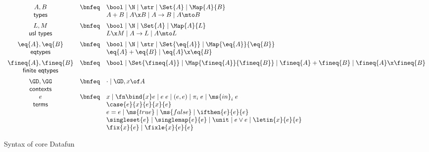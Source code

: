 \documentclass[preprint]{sigplanconf}
\renewcommand{\pipe}{\mathrel{\mid}} %
\newcommand{\uto}{\to}
\begin{document}



\begin{figure}
  \[\begin{array}{ccl}
    A, B     &\bnfeq& \bool \pipe \N \pipe \str \pipe \Set{A}
                      \pipe \Map{A}{B}
    \\
    \textsf{types} && A + B \pipe A \x B \pipe A \uto B \pipe A \mto B
    \vspace{0.5em}\\
    L, M         &\bnfeq& \bool \pipe \N \pipe \Set{A} \pipe \Map{A}{L}
    \\
    \textsf{usl types} && L \x M \pipe A \uto L \pipe A \mto L
    \vspace{0.5em}\\
    \eq{A}, \eq{B} &\bnfeq& \bool \pipe \N \pipe \str \pipe \Set{\eq{A}}
                            \pipe \Map{\eq{A}}{\eq{B}}
    \\
    \textsf{eqtypes} && \eq{A} + \eq{B} \pipe \eq{A} \x \eq{B}
    \vspace{0.5em}\\
    \fineq{A},\fineq{B}
    &\bnfeq& \bool \pipe \Set{\fineq{A}}
       \pipe \Map{\fineq{A}}{\fineq{B}}
       \pipe \fineq{A} + \fineq{B} \pipe \fineq{A} \x \fineq{B}\\
    \textsf{finite eqtypes}
    \vspace{0.5em}\\
    \GD,\GG &\bnfeq& \cdot \pipe \GD, x\of A\\
    \textsf{contexts}\\
    e &\bnfeq& x \pipe \fn\bind{x} e \pipe e\;e
    \pipe (e,e) \pipe \pi_i\;e \pipe \ms{in}_i\;e\\
    \textsf{terms}
    && \case{e}{x}{e}{x}{e}\\
    && e = e \pipe \ms{true} \pipe \ms{false} \pipe \ifthen{e}{e}{e}\\
    && \singleset{e} \pipe \singlemap{e}{e}
       \pipe \unit \pipe e \vee e \pipe \letin{x}{e}{e}\\
    && \fix{x}{e} \pipe \fixle{x}{e}{e}
  \end{array}\]
  \caption{Syntax of core Datafun}
  \label{fig:syntax}
\end{figure}
\end{document}
